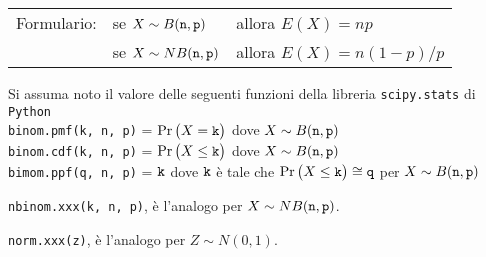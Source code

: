 \documentclass[11pt,twoside,a4paper]{article}
\begin{document}
\vfill\hrulefill\par
\begin{tabular}{@{}lll}
Formulario:& se $X\sim B({\tt n},{\tt p})$ & allora $E(X)=np$\\
           & se $X\sim NB({\tt n},{\tt p})$& allora $E(X)=n(1-p)/p$
\end{tabular}




Si assuma noto il valore delle seguenti funzioni della libreria {\tt scipy.stats\/} di  {\tt Python\/}\\
{\tt binom.pmf(k, n, p)} = $\Pr\big(X={\tt k}\big)$ dove $X\sim B({\tt n},{\tt p})$\\
{\tt binom.cdf(k, n, p)} = $\Pr\big(X\le{\tt k}\big)$ dove  $X\sim B({\tt n},{\tt p})$ \\
{\tt bimom.ppf(q, n, p)} = ${\tt k}$ dove ${\tt k}$ è tale che $\Pr\big(X\le{\tt k}\big)\cong{\tt q}$ per $X\sim B({\tt n},{\tt p})$ 

{\tt nbinom.xxx(k, n, p)}, è l'analogo per $X\sim NB({\tt n},{\tt p})$.

{\tt norm.xxx(z)}, è l'analogo per $Z\sim N(0,1)$.
\end{document}
